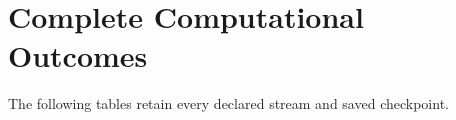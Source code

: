\section{Complete Computational Outcomes}\label{app:r15experiment}
The following tables retain every declared stream and saved checkpoint.


